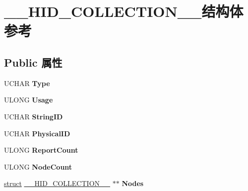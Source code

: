 \hypertarget{struct_____h_i_d___c_o_l_l_e_c_t_i_o_n____}{}\section{\+\_\+\+\_\+\+H\+I\+D\+\_\+\+C\+O\+L\+L\+E\+C\+T\+I\+O\+N\+\_\+\+\_\+结构体 参考}
\label{struct_____h_i_d___c_o_l_l_e_c_t_i_o_n____}
\subsection*{Public 属性}
\begin{DoxyCompactItemize}
\item 
\mbox{\label{struct_____h_i_d___c_o_l_l_e_c_t_i_o_n_____acc9bf1f1daba00faa7d8d96ada27d178}} 
U\+C\+H\+AR {\bfseries Type}
\item 
\mbox{\label{struct_____h_i_d___c_o_l_l_e_c_t_i_o_n_____a36c89c83e9ee668bb566e517a36986aa}} 
U\+L\+O\+NG {\bfseries Usage}
\item 
\mbox{\label{struct_____h_i_d___c_o_l_l_e_c_t_i_o_n_____a2ddc9101ef627516241534e8700f5cb1}} 
U\+C\+H\+AR {\bfseries String\+ID}
\item 
\mbox{\label{struct_____h_i_d___c_o_l_l_e_c_t_i_o_n_____ad44c38d189bf7529079e9e68ee63fb1b}} 
U\+C\+H\+AR {\bfseries Physical\+ID}
\item 
\mbox{\label{struct_____h_i_d___c_o_l_l_e_c_t_i_o_n_____a29af11eecb923cda5ae6e5bc4016a7b6}} 
U\+L\+O\+NG {\bfseries Report\+Count}
\item 
\mbox{\label{struct_____h_i_d___c_o_l_l_e_c_t_i_o_n_____aa6af42dfc9999122f83b70a4f76e58a5}} 
U\+L\+O\+NG {\bfseries Node\+Count}
\item 
\mbox{\label{struct_____h_i_d___c_o_l_l_e_c_t_i_o_n_____a8d347eb5be1d487c1d32e11b36838512}} 
\hyperlink{interfacestruct}{struct} \hyperlink{struct_____h_i_d___c_o_l_l_e_c_t_i_o_n____}{\+\_\+\+\_\+\+H\+I\+D\+\_\+\+C\+O\+L\+L\+E\+C\+T\+I\+O\+N\+\_\+\+\_\+} $\ast$$\ast$ {\bfseries Nodes}
$$
\end{DoxyCompactItemize}
